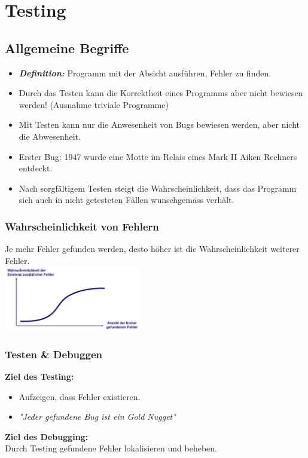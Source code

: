 \section{Testing}
\subsection{Allgemeine Begriffe}
\begin{itemize}
	\item \textbf{\textit{Definition:}} Programm mit der Absicht ausführen, Fehler zu finden. 
	\item Durch das Testen kann die Korrektheit eines Programms aber nicht bewiesen werden! (Ausnahme triviale Programme)
	\item Mit Testen kann nur die Anwesenheit von Bugs bewiesen werden, aber nicht die Abwesenheit. 
	\item Erster Bug: 1947 wurde eine Motte im Relais eines Mark II Aiken Rechners entdeckt.
	\item Nach sorgfältigem Testen steigt die Wahrscheinlichkeit, dass das Programm sich auch in nicht getesteten Fällen wunschgemäss verhält.
\end{itemize}
\begin{multicols}{2}
\subsubsection{Wahrscheinlichkeit von Fehlern}
Je mehr Fehler gefunden werden, desto höher ist die Wahrscheinlichkeit weiterer Fehler.\\
\includegraphics[width=6cm]{images/fehler_wkeit}
	
	\subsubsection{Testen \& Debuggen}
	\textbf{Ziel des Testing:} \\
	\begin{minipage}{10cm}
		\vspace{0.2cm}
		\begin{itemize}
			\item Aufzeigen, dass Fehler existieren.
			\item \textit{"{}Jeder gefundene Bug ist ein Gold Nugget"}
		\end{itemize}
		\textbf{Ziel des Debugging:} \\
		Durch Testing gefundene Fehler lokalisieren und beheben.		
	\end{minipage}
\end{multicols}

